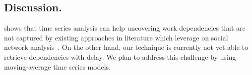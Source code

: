 \subsection{Discussion.}

 shows that time series analysis can help uncovering work dependencies that are not captured by existing approaches in literature which leverage on social network analysis~\cite{Zimmermann2008,Weicheng2013}. On the other hand, our technique is currently not yet able to retrieve dependencies with delay. We plan to address this challenge by using moving-average time series models.
